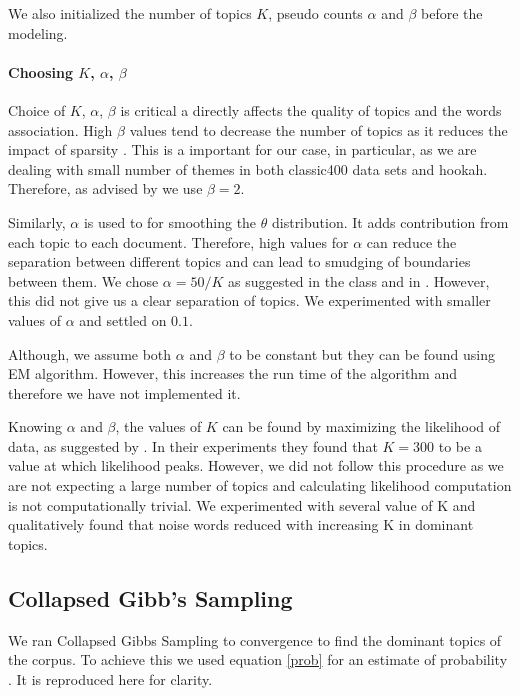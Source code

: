 \documentclass[11pt,a4paper,oneside]{article}
\begin{document}
We also initialized the number of topics $K$, pseudo counts $\alpha$ and $\beta$ before the modeling.

\paragraph{Choosing $K$, $\alpha$, $\beta$}
Choice of $K$, $\alpha$, $\beta$ is critical a directly affects the quality of topics and the words association. High $\beta$ values tend to decrease the number of topics as it reduces the impact of sparsity \cite{griffiths2004finding}. This is a important for our case, in particular, as we are dealing with small number of themes in both classic400 data sets and hookah. Therefore, as advised by \cite{griffiths2004finding} we use $\beta = 2$. 

Similarly, $\alpha$ is used to for smoothing the $\theta$ distribution. It adds contribution from each topic to each document. Therefore, high values for $\alpha$ can reduce the separation between different topics and can lead to smudging of boundaries between them. We chose $\alpha = 50/K$ as suggested in the class and in \cite{griffiths2004finding}. However, this did not give us a clear separation of topics. We experimented with smaller values of $\alpha$ and settled on $0.1$.

Although, we assume both $\alpha$ and $\beta$ to be constant but they can be found using EM algorithm. However, this increases the run time of the algorithm and therefore we have not implemented it.

Knowing $\alpha$ and $\beta$, the values of $K$ can be found by maximizing the likelihood of data, as suggested by \cite{griffiths2004finding}. In their experiments they found that $K = 300$ to be a value at which likelihood peaks. However, we did not follow this procedure as we are not expecting a large number of topics and calculating likelihood computation is not computationally trivial. We experimented with several value of K and qualitatively found that noise words reduced with increasing K in dominant topics.

\subsection{Collapsed Gibb's Sampling}
We ran Collapsed Gibbs Sampling to convergence to find the dominant topics of the corpus. To achieve this we used equation \ref{prob} for an estimate of probability \cite{classNotes}. It is reproduced here for clarity.
\end{document}

